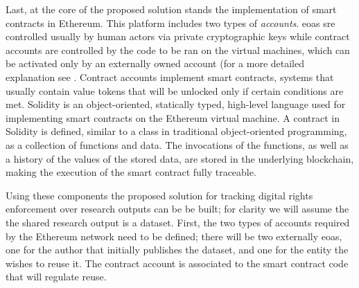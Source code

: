 Last, at the core of the proposed solution stands the implementation of smart contracts in Ethereum. This platform includes two types of \emph{accounts}. \glspl{eoa} sre controlled usually by human actors via private cryptographic keys while contract accounts are controlled by the code to be ran on the virtual machines, which can be activated only by an externally owned account (for a more detailed explanation see \cite{ethdocs}. Contract accounts implement smart contracts, systems that usually contain value tokens that will be unlocked only if certain conditions are met. Solidity is an object-oriented, statically typed, high-level language used for implementing smart contracts on the Ethereum virtual machine\cite{solidity}. A contract in Solidity is defined, similar to a class in traditional object-oriented programming, as a collection of functions and data. The invocations of the functions, as well as a history of the values of the stored data, are stored in the underlying blockchain, making the execution of the smart contract fully traceable.

Using these components the proposed solution for tracking digital rights enforcement over research outputs can be be built; for clarity we will assume the the shared research output is a dataset. First, the two types of accounts required by the Ethereum network need to be defined; there will be two externally \glspl{eoa}, one for the author that initially publishes the dataset, and one for the entity the wishes to reuse it. The contract account is associated to the smart contract code that will regulate reuse.

